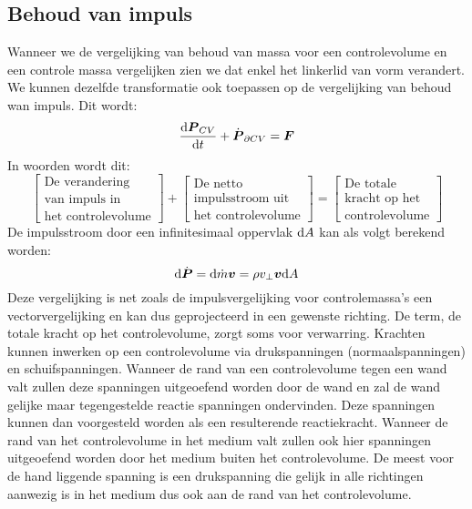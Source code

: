 			\subsection{Behoud van impuls}
			\label{sec:Behoud van impuls}
Wanneer we de vergelijking van behoud van massa voor een controlevolume en een controle massa vergelijken zien we dat enkel het linkerlid van vorm verandert. We kunnen dezelfde transformatie ook toepassen op de vergelijking van behoud wan impuls. Dit wordt:
\begin{equation}
	\frac{\mathrm{d} \boldsymbol{P}_{CV}}{\mathrm{d} t} + \dot{\boldsymbol{P}}_{\partial CV} =  \boldsymbol{F}
	\label{eqn:controlevolume,behoud van impuls}
\end{equation}
In woorden wordt dit:
\begin{equation}
	\left[
		\begin{array}{c}
			\mbox{De verandering} \\ \mbox{van impuls in} \\ \mbox{het controlevolume}
		\end{array}
	\right]
	+
	\left[
		\begin{array}{c}
			\mbox{De netto} \\ \mbox{impulsstroom uit} \\ \mbox{het controlevolume}
		\end{array}
	\right]
	=
	\left[
		\begin{array}{c}
			\mbox{De totale} \\ \mbox{kracht op het} \\ \mbox{controlevolume}
		\end{array}
	\right]
	\label{eqn:controlevolume,behoud van impuls,woorden}
\end{equation}
De impulsstroom door een infinitesimaal oppervlak $\mathrm{d} A$ kan als volgt berekend worden:
\begin{equation}
	\mathrm{d} \dot{\boldsymbol{P}} =  \mathrm{d} \dot{m} \boldsymbol{v} = \rho v_{\perp} \boldsymbol{v} \mathrm{d} A
	\label{eqn:impulsstroom}
\end{equation}
Deze vergelijking is net zoals de impulsvergelijking voor controlemassa's een vectorvergelijking en kan dus geprojecteerd in een gewenste richting.
\npar
De term, de totale kracht op het controlevolume, zorgt soms voor verwarring. Krachten kunnen inwerken op een controlevolume via drukspanningen (normaalspanningen) en schuifspanningen. Wanneer de rand van een controlevolume tegen een wand valt zullen deze spanningen uitgeoefend worden door de wand en zal de wand gelijke maar tegengestelde reactie spanningen ondervinden. Deze spanningen kunnen dan voorgesteld worden als een resulterende reactiekracht. Wanneer de rand van het controlevolume in het medium valt zullen ook hier spanningen uitgeoefend worden door het medium buiten het controlevolume. De meest voor de hand liggende spanning is een drukspanning die gelijk in alle richtingen aanwezig is in het medium dus ook aan de rand van het controlevolume.
